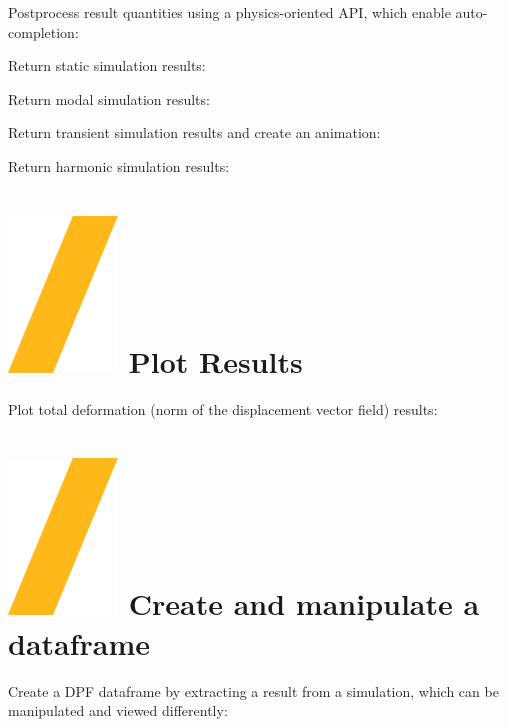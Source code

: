 \documentclass[9pt,landscape]{article}
\begin{document}
\begin{multicols}{3}
Postprocess result quantities using a physics-oriented API, which enable auto-completion:

\vspace{2mm} %

Return static simulation results:


Return modal simulation results:


Return transient simulation results and create an animation:


Return harmonic simulation results:


\section{\includegraphics[height=\fontcharht\font`\S]{slash.png} Plot Results}

Plot total deformation (norm of the displacement vector field) results:



\section{\includegraphics[height=\fontcharht\font`\S]{slash.png} Create and manipulate a dataframe}
Create a DPF dataframe by extracting a result from a simulation, which can be manipulated and viewed differently:


\end{multicols}
\end{document}

